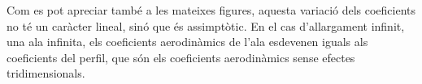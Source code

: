 Com es pot apreciar també a les mateixes figures, aquesta variació dels coeficients no té un caràcter lineal, sinó que és assimptòtic. En el cas d'allargament infinit, una ala infinita, els coeficients aerodinàmics de l'ala esdevenen iguals als coeficients del perfil, que són els coeficients aerodinàmics sense efectes tridimensionals.